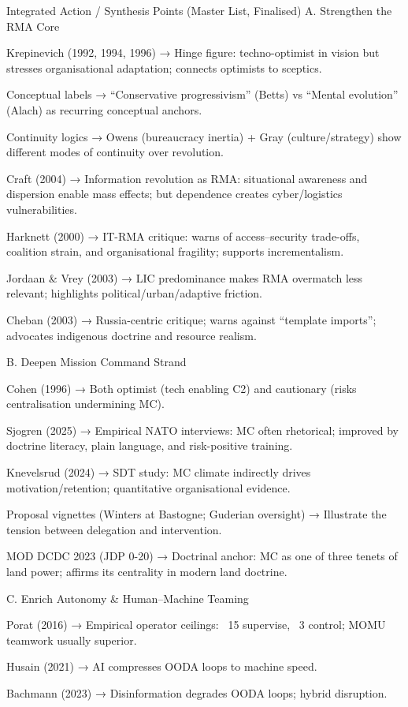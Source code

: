 Integrated Action / Synthesis Points (Master List, Finalised)
A. Strengthen the RMA Core

Krepinevich (1992, 1994, 1996) → Hinge figure: techno-optimist in vision but stresses organisational adaptation; connects optimists to sceptics.

Conceptual labels → “Conservative progressivism” (Betts) vs “Mental evolution” (Alach) as recurring conceptual anchors.

Continuity logics → Owens (bureaucracy inertia) + Gray (culture/strategy) show different modes of continuity over revolution.

Craft (2004) → Information revolution as RMA: situational awareness and dispersion enable mass effects; but dependence creates cyber/logistics vulnerabilities.

Harknett (2000) → IT-RMA critique: warns of access–security trade-offs, coalition strain, and organisational fragility; supports incrementalism.

Jordaan \& Vrey (2003) → LIC predominance makes RMA overmatch less relevant; highlights political/urban/adaptive friction.

Cheban (2003) → Russia-centric critique; warns against “template imports”; advocates indigenous doctrine and resource realism.

B. Deepen Mission Command Strand

Cohen (1996) → Both optimist (tech enabling C2) and cautionary (risks centralisation undermining MC).

Sjogren (2025) → Empirical NATO interviews: MC often rhetorical; improved by doctrine literacy, plain language, and risk-positive training.

Knevelsrud (2024) → SDT study: MC climate indirectly drives motivation/retention; quantitative organisational evidence.

Proposal vignettes (Winters at Bastogne; Guderian oversight) → Illustrate the tension between delegation and intervention.

MOD DCDC 2023 (JDP 0-20) → Doctrinal anchor: MC as one of three tenets of land power; affirms its centrality in modern land doctrine.

C. Enrich Autonomy \& Human–Machine Teaming

Porat (2016) → Empirical operator ceilings: ~15 supervise, ~3 control; MOMU teamwork usually superior.

Husain (2021) → AI compresses OODA loops to machine speed.

Bachmann (2023) → Disinformation degrades OODA loops; hybrid disruption.

